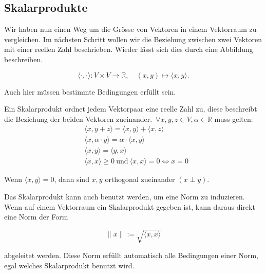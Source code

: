 \subsection{Skalarprodukte}

Wir haben nun einen Weg um die Grösse von Vektoren in einem Vektorraum zu vergleichen. Im nächsten Schritt wollen wir die Beziehung zwischen zwei Vektoren mit einer reellen Zahl beschrieben. Wieder lässt sich dies durch eine Abbildung beschreiben. 

\begin{equation*}
    \langle \cdot, \cdot \rangle : V \times V \rightarrow \mathbb{R}, \quad (x, y) \mapsto \langle x, y \rangle.
\end{equation*}

\vspace{0.5\baselineskip}

Auch hier müssen bestimmte Bedingungen erfüllt sein.

\begin{tcolorbox}[colback=gray!30, colframe=gray!80, title=Skalarprodukte]
    Ein Skalarprodukt ordnet jedem Vektorpaar eine reelle Zahl zu, diese beschreibt die Beziehung der beiden Vektoren zueinander.\ \( \forall x, y, z \in V, \alpha \in \mathbb{R} \) muss gelten:
    \begin{equation*}
        \begin{aligned}
            & \langle x, y + z \rangle = \langle x, y \rangle + \langle x, z \rangle \\[0.5em]
            & \langle x, \alpha \cdot y \rangle = \alpha \cdot \langle x, y \rangle \\[0.5em]
            & \langle x, y \rangle = \langle y, x \rangle \\[0.5em]
            & \langle x, x \rangle \geq 0 \ \text{und} \ \langle x, x \rangle = 0 \Leftrightarrow x = 0
        \end{aligned}
    \end{equation*}
\end{tcolorbox}

\vspace{0.5\baselineskip}

Wenn \( \langle x, y \rangle = 0 \), dann sind \( x, y \) orthogonal zueinander \( (x \perp y) \). 

\vspace{1\baselineskip}

Das Skalarprodukt kann auch benutzt werden, um eine Norm zu induzieren. Wenn auf einem Vektorraum ein Skalarprodukt gegeben ist, kann daraus direkt eine Norm der Form

\begin{equation*}
    \| x \| := \sqrt{\langle x, x \rangle}
\end{equation*}

abgeleitet werden. Diese Norm erfüllt automatisch alle Bedingungen einer Norm, egal welches Skalarprodukt benutzt wird. 